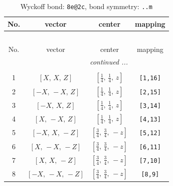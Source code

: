 \documentclass[fleqn,8pt]{jsarticle}
\begin{document}
\begin{longtable}{cccc}
\caption{Wyckoff bond: {\tt 8e@2c}, bond symmetry: {\tt ..m}}
 \\
 \hline \hline
No. & vector & center & mapping \\ \hline \endfirsthead

\multicolumn{3}{l}{\tablename\ \thetable{}} \\
 \hline \hline
No. & vector & center & mapping \\ \hline \endhead

 \hline \hline
\multicolumn{3}{r}{\footnotesize\it continued ...} \\ \endfoot

 \hline \hline
\multicolumn{3}{r}{} \\ \endlastfoot

1 & $\left[ X,\, X,\, Z \right]$ & $\left[ \frac{1}{4},\, \frac{1}{4},\, z \right]$ & {\tt [1,16]} \\ \hline
2 & $\left[ - X,\, - X,\, Z \right]$ & $\left[ \frac{1}{4},\, \frac{1}{4},\, z \right]$ & {\tt [2,15]} \\ \hline
3 & $\left[ - X,\, X,\, Z \right]$ & $\left[ \frac{1}{4},\, \frac{1}{4},\, z \right]$ & {\tt [3,14]} \\ \hline
4 & $\left[ X,\, - X,\, Z \right]$ & $\left[ \frac{1}{4},\, \frac{1}{4},\, z \right]$ & {\tt [4,13]} \\ \hline
5 & $\left[ - X,\, X,\, - Z \right]$ & $\left[ \frac{3}{4},\, \frac{3}{4},\, - z \right]$ & {\tt [5,12]} \\ \hline
6 & $\left[ X,\, - X,\, - Z \right]$ & $\left[ \frac{3}{4},\, \frac{3}{4},\, - z \right]$ & {\tt [6,11]} \\ \hline
7 & $\left[ X,\, X,\, - Z \right]$ & $\left[ \frac{3}{4},\, \frac{3}{4},\, - z \right]$ & {\tt [7,10]} \\ \hline
8 & $\left[ - X,\, - X,\, - Z \right]$ & $\left[ \frac{3}{4},\, \frac{3}{4},\, - z \right]$ & {\tt [8,9]} \\
\end{longtable}
\renewcommand{\arraystretch}{1.2}
\end{document}
